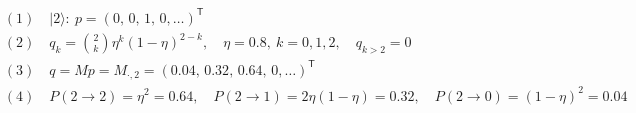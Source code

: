 \documentclass[12pt]{article}
\begin{document}
\fontsize{22}{28}\selectfont
\begin{align*}
&(1)\quad
  |2\rangle:\ 
  p=(0,\,0,\,1,\,0,\ldots)^{\mathsf T}
  \\[0.50em]
&(2)\quad
  q_k=\binom{2}{k}\eta^{k}(1-\eta)^{2-k},
  \quad \eta=0.8,\ k=0,1,2,
  \quad q_{k>2}=0
  \\[0.50em]
&(3)\quad
  q=Mp=M_{\cdot,2}
  =(0.04,\,0.32,\,0.64,\,0,\ldots)^{\mathsf T}
  \\[0.50em]
&(4)\quad
  P(2\to 2)=\eta^{2}=0.64,\quad
  P(2\to 1)=2\eta(1-\eta)=0.32,\quad
  P(2\to 0)=(1-\eta)^{2}=0.04
\end{align*}
\end{document}
